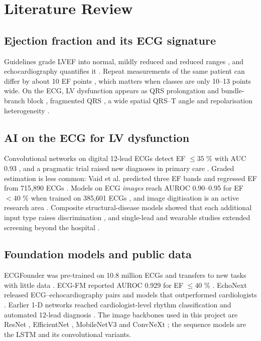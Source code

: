 \chapter{Literature Review}\label{ch:2}

\section{Ejection fraction and its ECG signature}\label{sec:2.1}

Guidelines grade LVEF into normal, mildly reduced and reduced ranges \cite{ref1,ref2}, and echocardiography quantifies it \cite{ref5}. Repeat measurements of the same patient can differ by about 10 EF points \cite{ref6}, which matters when classes are only 10--13 points wide. On the ECG, LV dysfunction appears as QRS prolongation and bundle-branch block \cite{ref7}, fragmented QRS \cite{ref8}, a wide spatial QRS--T angle \cite{ref9} and repolarisation heterogeneity \cite{ref10,ref11}.

\section{AI on the ECG for LV dysfunction}\label{sec:2.2}

Convolutional networks on digital 12-lead ECGs detect EF $\le35$ \% with AUC 0.93 \cite{ref3}, and a pragmatic trial raised new diagnoses in primary care \cite{ref4}. Graded estimation is less common: Vaid et al. predicted three EF bands and regressed EF from 715,890 ECGs \cite{ref12}. Models on ECG \emph{images} reach AUROC 0.90--0.95 for EF $<40$ \% when trained on 385,601 ECGs \cite{ref13}, and image digitisation is an active research area \cite{ref14,ref15,ref16}. Composite structural-disease models showed that each additional input type raises discrimination \cite{ref17}, and single-lead and wearable studies extended screening beyond the hospital \cite{ref18,ref19,ref20}.

\section{Foundation models and public data}\label{sec:2.3}



ECGFounder was pre-trained on 10.8 million ECGs and transfers to new tasks with little data \cite{ref21}. ECG-FM reported AUROC 0.929 for EF $\le40$ \% \cite{ref22}. EchoNext released ECG--echocardiography pairs and models that outperformed cardiologists \cite{ref23,ref24}. Earlier 1-D networks reached cardiologist-level rhythm classification \cite{ref25} and automated 12-lead diagnosis \cite{ref26}. The image backbones used in this project are ResNet \cite{ref27}, EfficientNet \cite{ref28}, MobileNetV3 \cite{ref29} and ConvNeXt \cite{ref30}; the sequence models are the LSTM \cite{ref31} and its convolutional variants.

